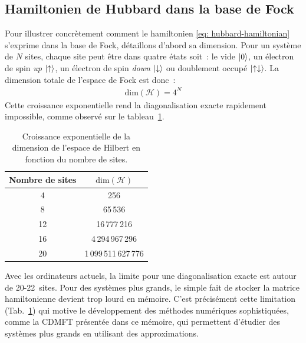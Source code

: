 \subsection{Hamiltonien de Hubbard dans la base de Fock}

Pour illustrer concrètement comment le hamiltonien \eqref{eq: hubbard-hamiltonian} s'exprime dans la base de Fock, détaillons d'abord sa dimension. Pour un système de $N$ sites, chaque site peut être dans quatre états soit~: le vide $|{0}\rangle$, un électron de spin \textit{up} $|{\uparrow}\rangle$, un électron de spin \textit{down} $|{\downarrow}\rangle$ ou doublement occupé $|{\uparrow\downarrow}\rangle$. La dimension totale de l'espace de Fock est donc~:
\begin{align}
    \text{dim}(\mathcal{H}) = 4^N
\end{align}
Cette croissance exponentielle rend la diagonalisation exacte rapidement impossible, comme observé sur le tableau~\ref{tab:hilbert_dimension}.
\begin{table}[h!]
\centering
\begin{tabular}{cc}
\hline
Nombre de sites & $\text{dim}(\mathcal{H})$ \\
\hline
4 & 256 \\
8 & 65\,536 \\
12 & 16\,777\,216 \\
16 & 4\,294\,967\,296 \\
20 & 1\,099\,511\,627\,776 \\
\hline
\end{tabular}
\caption{Croissance exponentielle de la dimension de l'espace de Hilbert en fonction du nombre de sites.}
\label{tab:hilbert_dimension}
\end{table}
Avec les ordinateurs actuels, la limite pour une diagonalisation exacte
est autour de 20-22~sites. Pour des systèmes plus grands, le simple fait de stocker la matrice hamiltonienne devient trop lourd en mémoire. C'est précisément cette limitation (Tab.~\ref{tab:hilbert_dimension}) qui motive le développement des méthodes numériques sophistiquées, comme la CDMFT présentée dans ce mémoire, qui permettent d'étudier des systèmes plus grands en utilisant des approximations.
